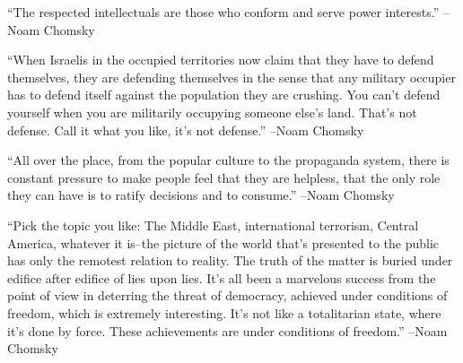\documentclass{article}%
\begin{document}
\linebreak%
\vspace{1mm}%
\begin{minipage}{\textwidth}%
\flushleft%
“The respected intellectuals are those who conform and serve power interests.”%
\linebreak%
\vspace{1mm}%
–Noam Chomsky%
\linebreak%
\vspace{1mm}%
\end{minipage}%
\linebreak%
\vspace{1mm}%
\begin{minipage}{\textwidth}%
\flushleft%
“When Israelis in the occupied territories now claim that they have to defend themselves, they are defending themselves in the sense that any military occupier has to defend itself against the population they are crushing. You can't defend yourself when you are militarily occupying someone else's land. That's not defense. Call it what you like, it's not defense.”%
\linebreak%
\vspace{1mm}%
–Noam Chomsky%
\linebreak%
\vspace{1mm}%
\end{minipage}%
\linebreak%
\vspace{1mm}%
\begin{minipage}{\textwidth}%
\flushleft%
“All over the place, from the popular culture to the propaganda system, there is constant pressure to make people feel that they are helpless, that the only role they can have is to ratify decisions and to consume.”%
\linebreak%
\vspace{1mm}%
–Noam Chomsky%
\linebreak%
\vspace{1mm}%
\end{minipage}%
\linebreak%
\vspace{1mm}%
\begin{minipage}{\textwidth}%
\flushleft%
“Pick the topic you like: The Middle East, international terrorism, Central America, whatever it is–the picture of the world that's presented to the public has only the remotest relation to reality. The truth of the matter is buried under edifice after edifice of lies upon lies. It's all been a marvelous success from the point of view in deterring the threat of democracy, achieved under conditions of freedom, which is extremely interesting. It's not like a totalitarian state, where it's done by force. These achievements are under conditions of freedom.”%
\linebreak%
\vspace{1mm}%
–Noam Chomsky%
\linebreak%
\vspace{1mm}%
\end{minipage}%
\end{document}
